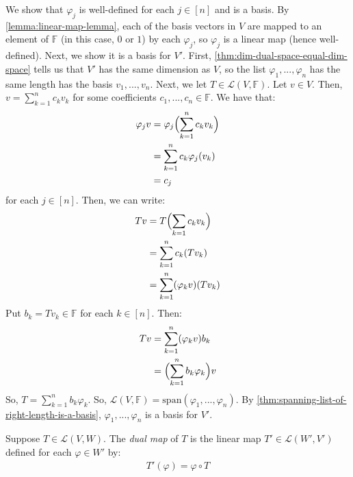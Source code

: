 \documentclass{article}
\begin{document}
\begin{remark}
  We show that $\varphi_j$ is well-defined for each $j \in
  [n]$ and is a basis. By \cref{lemma:linear-map-lemma}, each of the basis vectors in
  $V$ are mapped to an element of $\mathbb{F}$ (in this case, $0$ or
  $1$) by each $\varphi_j$, so $\varphi_j$ is a linear map (hence well-defined). Next, we
  show it is a basis for $V'$. First, \cref{thm:dim-dual-space-equal-dim-space} tells us that
  $V'$ has the same dimension as $V$, so the list $\varphi_1, ...,
  \varphi_n$ has the same length has the basis $v_1, ..., v_n$. Next,
  we let $T \in \mathcal{L}(V, \mathbb{F})$. Let $v \in V$. Then, $v =
  \sum_{k=1}^n c_k v_k$ for some coefficients $c_1, ..., c_n \in
  \mathbb{F}$. We have that:
  \begin{align*}
    \varphi_jv &= \varphi_j\Bigl(\sum_{k=1}^n c_k v_k\Bigr) \\
               &= \sum_{k=1}^n c_k \varphi_j(v_k) \\
               &= c_j \\
  \end{align*}
  for each $j \in [n]$. Then, we can write:
  \begin{align*}
    Tv &= T\Bigl( \sum_{k=1}c_k v_k \Bigr) \\
       &= \sum_{k=1}^n c_k(Tv_k) \\
       &= \sum_{k=1}^n (\varphi_kv)(Tv_k) \\
  \end{align*}
  Put $b_k = Tv_k \in \mathbb{F}$ for each $k \in [n]$. Then:
  \begin{align*}
    Tv &= \sum_{k=1}^n (\varphi_k v)b_k \\
       &= \Bigl(\sum_{k=1}^n b_k\varphi_k\Bigr)v \\
  \end{align*}
  So, $T = \sum_{k=1}^n b_k \varphi_k$. So, $\mathcal{L}(V,
  \mathbb{F}) = \text{span}(\varphi_1, ..., \varphi_n)$. By
  \cref{thm:spanning-list-of-right-length-is-a-basis}, $\varphi_1,
  ..., \varphi_n$ is a basis for $V'$.
\end{remark}

\begin{definition}
  \label{def:dual-map}
  Suppose $T \in \mathcal{L}(V, W)$. The \textit{dual map} of $T$ is
  the linear map $T' \in \mathcal{L}(W', V')$ defined for each
  $\varphi \in W'$ by:
  \begin{align*}
    T'(\varphi) = \varphi \circ T
  \end{align*}
\end{definition}
\end{document}
